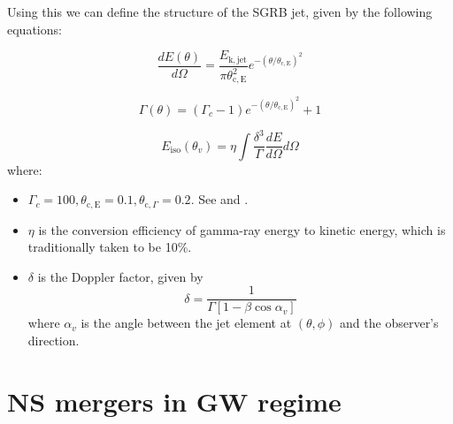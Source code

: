     Using this we can define the structure of the SGRB jet, given by the following
    equations:

    \begin{equation}
        \dfrac{dE(\theta)}{d\Omega} =
            \dfrac{E_{\mathrm{k, jet}}}{\pi \theta_{\mathrm{c, E}}^2}
            e^{-(\theta/\theta_{\mathrm{c, E}})^2}
        \label{eq:dE_dOmega}
    \end{equation}

    \begin{equation}
        \Gamma(\theta) = (\Gamma_c - 1)e^{-(\theta/\theta_{\mathrm{c, E}})^2} + 1
    \end{equation}

    \begin{equation}
        E_{\mathrm{iso}}(\theta_v) =
            \eta \int \dfrac{\delta^3}{\Gamma} \dfrac{dE}{d\Omega} d\Omega
        \label{eq:eiso}
    \end{equation}
    where:

    \begin{itemize}

        \item $\Gamma_c = 100, \theta_{\mathrm{c, E}} = 0.1, \theta_{\mathrm{c}, \Gamma}
            = 0.2$.  See \cite{salafia_2015} and \cite{barbieri_2019}.

        \item $\eta$ is the conversion efficiency of gamma-ray energy to kinetic energy,
            which is traditionally taken to be 10\%.

        \item $\delta$ is the Doppler factor, given by $$\delta = \dfrac{1}{\Gamma[1 -
            \beta \cos \alpha_v]}$$ where $\alpha_v$ is the angle between the jet
            element at $(\theta, \phi)$ and the observer's direction.
    \end{itemize}

\section{NS mergers in GW regime}


